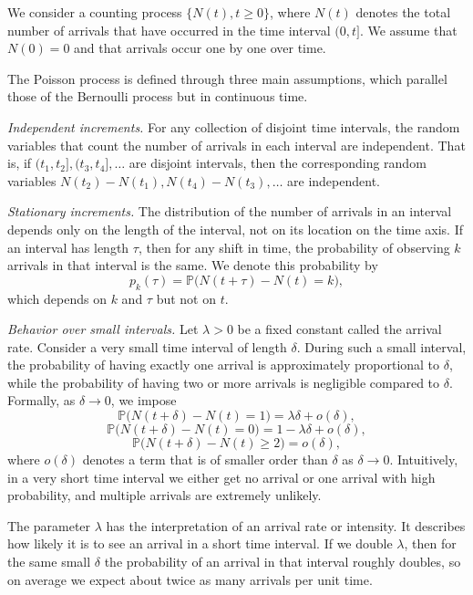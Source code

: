 We consider a counting process \(\{N(t), t \ge 0\}\), where \(N(t)\) denotes the total number of arrivals that have occurred in the time interval \((0,t]\).  
We assume that \(N(0) = 0\) and that arrivals occur one by one over time.  

The Poisson process is defined through three main assumptions, which parallel those of the Bernoulli process but in continuous time.  

\textit{Independent increments.}  
For any collection of disjoint time intervals, the random variables that count the number of arrivals in each interval are independent.  
That is, if \((t_1,t_2], (t_3,t_4], \ldots\) are disjoint intervals, then the corresponding random variables \(N(t_2) - N(t_1), N(t_4) - N(t_3), \ldots\) are independent.  

\textit{Stationary increments.}  
The distribution of the number of arrivals in an interval depends only on the length of the interval, not on its location on the time axis.  
If an interval has length \(\tau\), then for any shift in time, the probability of observing \(k\) arrivals in that interval is the same.  
We denote this probability by
\[
p_k(\tau) = \mathbb{P}\big(N(t+\tau) - N(t) = k\big),
\]
which depends on \(k\) and \(\tau\) but not on \(t\).  

\textit{Behavior over small intervals.}  
Let \(\lambda > 0\) be a fixed constant called the arrival rate.  
Consider a very small time interval of length \(\delta\).  
During such a small interval, the probability of having exactly one arrival is approximately proportional to \(\delta\), while the probability of having two or more arrivals is negligible compared to \(\delta\).  
Formally, as \(\delta \to 0\), we impose
\[
\mathbb{P}\big(N(t+\delta) - N(t) = 1\big) = \lambda \delta + o(\delta),
\]
\[
\mathbb{P}\big(N(t+\delta) - N(t) = 0\big) = 1 - \lambda \delta + o(\delta),
\]
\[
\mathbb{P}\big(N(t+\delta) - N(t) \ge 2\big) = o(\delta),
\]
where \(o(\delta)\) denotes a term that is of smaller order than \(\delta\) as \(\delta \to 0\).  
Intuitively, in a very short time interval we either get no arrival or one arrival with high probability, and multiple arrivals are extremely unlikely.  

The parameter \(\lambda\) has the interpretation of an arrival rate or intensity.  
It describes how likely it is to see an arrival in a short time interval.  
If we double \(\lambda\), then for the same small \(\delta\) the probability of an arrival in that interval roughly doubles, so on average we expect about twice as many arrivals per unit time.  

